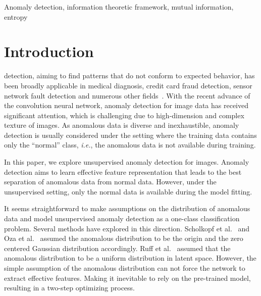 \documentclass[journal]{IEEEtran}
\theoremstyle{remark}
\begin{document}
\begin{IEEEkeywords}
Anomaly detection, information theoretic framework, mutual information, entropy
\end{IEEEkeywords}

\IEEEpeerreviewmaketitle

\section{Introduction}

 detection, aiming to find patterns that do not conform to expected behavior, has been broadly applicable in medical diagnosis, credit card fraud detection, sensor network fault detection and numerous other fields~\cite{chandola2009anomaly}.
With the recent advance of the convolution neural network, anomaly detection for image data has received significant attention, which is challenging due to high-dimension and complex texture of images.
As anomalous data is diverse and inexhaustible, anomaly detection is usually considered under the setting where the training data contains only the ``normal'' class, \emph{i.e.}, the anomalous data is not available during training. 

In this paper, we explore unsupervised anomaly detection for images. Anomaly detection aims to learn effective feature representation that leads to the best separation of anomalous data from normal data. However, under the unsupervised setting, only the normal data is available during the model fitting. 

It seems straightforward to make  assumptions on the distribution of anomalous data and model unsupervised anomaly detection as a one-class classification problem. Several methods have explored in this direction. 
Scholkopf et al.~\cite{OC-SVM} and Oza et al.~\cite{oza2018one} assumed the anomalous distribution to be the origin and the zero centered Gaussian distribution accordingly. Ruff et al.~\cite{SVDD} assumed that the anomalous distribution to be a uniform distribution in latent space.
However, the simple assumption of the anomalous distribution can not force the network to extract effective features. Making it inevitable to rely on the pre-trained model, resulting in a two-step optimizing process.
\end{document}
